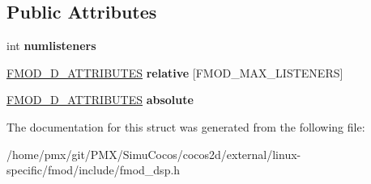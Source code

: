 \subsection*{Public Attributes}
\begin{DoxyCompactItemize}
\item 
\mbox{\label{structFMOD__DSP__PARAMETER__3DATTRIBUTES__MULTI_a1f25f9b6a06c87971316cbdfdccb257c}} 
int {\bfseries numlisteners}
\item 
\mbox{\label{structFMOD__DSP__PARAMETER__3DATTRIBUTES__MULTI_a1afe302d1bb9bb94441de3b7513483fb}} 
\hyperlink{structFMOD__3D__ATTRIBUTES}{F\+M\+O\+D\+\_\+D\+\_\+\+A\+T\+T\+R\+I\+B\+U\+T\+ES} {\bfseries relative} \mbox{[}F\+M\+O\+D\+\_\+\+M\+A\+X\+\_\+\+L\+I\+S\+T\+E\+N\+E\+RS\mbox{]}
\item 
\mbox{\label{structFMOD__DSP__PARAMETER__3DATTRIBUTES__MULTI_a7b72c1a45692b7c448fbd7b611eed3ee}} 
\hyperlink{structFMOD__3D__ATTRIBUTES}{F\+M\+O\+D\+\_\+D\+\_\+\+A\+T\+T\+R\+I\+B\+U\+T\+ES} {\bfseries absolute}
\end{DoxyCompactItemize}


The documentation for this struct was generated from the following file\+:\begin{DoxyCompactItemize}
\item 
/home/pmx/git/\+P\+M\+X/\+Simu\+Cocos/cocos2d/external/linux-\/specific/fmod/include/fmod\+\_\+dsp.\+h\end{DoxyCompactItemize}
